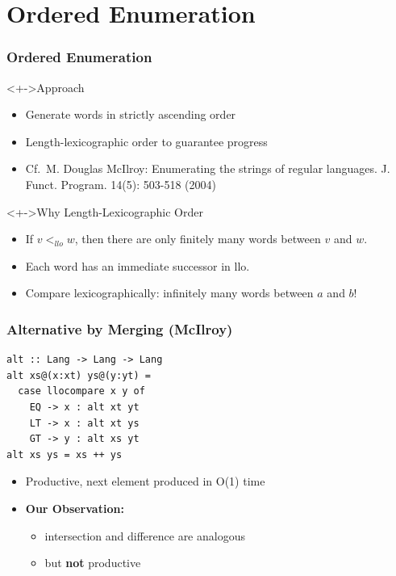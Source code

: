 \documentclass[pdftex,aspectratio=169]{beamer}
\begin{document}
\section{Ordered Enumeration}
\begin{frame}[fragile]
  \frametitle{Ordered Enumeration}
  \vspace{-1.5\baselineskip}
  \begin{block}<+->{Approach}
    \begin{itemize}
    \item Generate words in strictly ascending order
    \item Length-lexicographic order to guarantee progress
    \item Cf.\ M. Douglas McIlroy:
      Enumerating the strings of regular languages. J. Funct. Program. 14(5): 503-518 (2004)
    \end{itemize}
  \end{block}
  \begin{block}<+->{Why Length-Lexicographic Order}
    \begin{itemize}
    \item If $v<_{llo}w$, then there are only finitely many words between $v$ and $w$.
    \item Each word has an immediate successor in llo.
    \item Compare lexicographically: infinitely many words between $a$ and $b$!
    \end{itemize}
  \end{block}
\end{frame}
\begin{frame}
  \frametitle{Alternative by Merging (McIlroy)}
\begin{lstlisting}[numbers=none]
alt :: Lang -> Lang -> Lang
alt xs@(x:xt) ys@(y:yt) =
  case llocompare x y of
    EQ -> x : alt xt yt
    LT -> x : alt xt ys
    GT -> y : alt xs yt
alt xs ys = xs ++ ys
\end{lstlisting}
  \begin{itemize}
  \item Productive, next element produced in O(1) time
  \item \textbf{Our Observation:}
    \begin{itemize}
    \item intersection and difference are analogous
    \item but \textbf{not} productive
    \end{itemize}
  \end{itemize}
\end{frame}
\end{document}
